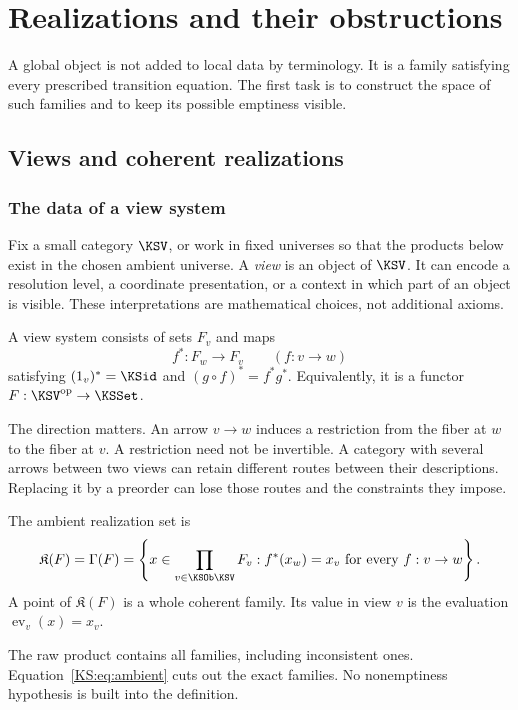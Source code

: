 

\chapter{Realizations and their obstructions}\label{KS:book:chapter-19}
A global object is not added to local data by terminology. It is a family satisfying every prescribed transition equation. The first task is to construct the space of such families and to keep its possible emptiness visible.

\section{Views and coherent realizations}\label{KS:sec:views}
\subsection{The data of a view system}
Fix a small category \(\KSV\), or work in fixed universes so that the products below exist in the chosen ambient universe. A \emph{view} is an object of \(\KSV\). It can encode a resolution level, a coordinate presentation, or a context in which part of an object is visible. These interpretations are mathematical choices, not additional axioms.

\begin{KSdefinition}
A view system consists of sets \(F_v\) and maps
\[
 f^*:F_w\longrightarrow F_v\qquad(f:v\longrightarrow w)
\]
satisfying \((1_v)^*=\KSid\) and \((g\circ f)^*=f^*g^*\). Equivalently, it is a functor \(F:\KSV^{\mathrm{op}}\to\KSSet\).
\end{KSdefinition}
The direction matters. An arrow \(v\to w\) induces a restriction from the fiber at \(w\) to the fiber at \(v\). A restriction need not be invertible. A category with several arrows between two views can retain different routes between their descriptions. Replacing it by a preorder can lose those routes and the constraints they impose.

\begin{KSdefinition}
The ambient realization set is
\begin{equation}\label{KS:eq:ambient}
 \mathfrak K(F)=\Gamma(F)=
 \left\{x\in\prod_{v\in\KSOb\KSV}F_v:
 f^*(x_w)=x_v\text{ for every }f:v\to w\right\}.
\end{equation}
A point of \(\mathfrak K(F)\) is a whole coherent family. Its value in view \(v\) is the evaluation \(\operatorname{ev}_v(x)=x_v\).
\end{KSdefinition}
The raw product contains all families, including inconsistent ones. Equation~\eqref{KS:eq:ambient} cuts out the exact families. No nonemptiness hypothesis is built into the definition.

